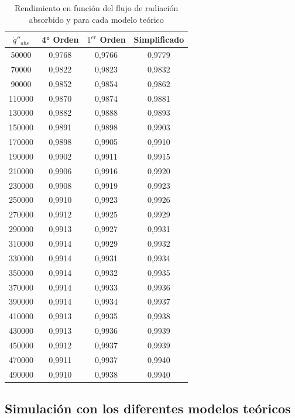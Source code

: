 \begin{table}[H]
\centering
\caption{Rendimiento en función del flujo de radiación absorbido y para cada modelo teórico}
\label{tab:rendimiento_qabs}
\begin{tabular}{cccc}
$\dot q''_{abs}$    & 4° Orden & $1^{er}$ Orden & Simplificado \\ \hline
50000  & 0,9768   & 0,9766    & 0,9779       \\
70000  & 0,9822   & 0,9823    & 0,9832       \\
90000  & 0,9852   & 0,9854    & 0,9862       \\
110000 & 0,9870   & 0,9874    & 0,9881       \\
130000 & 0,9882   & 0,9888    & 0,9893       \\
150000 & 0,9891   & 0,9898    & 0,9903       \\
170000 & 0,9898   & 0,9905    & 0,9910       \\
190000 & 0,9902   & 0,9911    & 0,9915       \\
210000 & 0,9906   & 0,9916    & 0,9920       \\
230000 & 0,9908   & 0,9919    & 0,9923       \\
250000 & 0,9910   & 0,9923    & 0,9926       \\
270000 & 0,9912   & 0,9925    & 0,9929       \\
290000 & 0,9913   & 0,9927    & 0,9931       \\
310000 & 0,9914   & 0,9929    & 0,9932       \\
330000 & 0,9914   & 0,9931    & 0,9934       \\
350000 & 0,9914   & 0,9932    & 0,9935       \\
370000 & 0,9914   & 0,9933    & 0,9936       \\
390000 & 0,9914   & 0,9934    & 0,9937       \\
410000 & 0,9913   & 0,9935    & 0,9938       \\
430000 & 0,9913   & 0,9936    & 0,9939       \\
450000 & 0,9912   & 0,9937    & 0,9939       \\
470000 & 0,9911   & 0,9937    & 0,9940       \\
490000 & 0,9910   & 0,9938    & 0,9940
\end{tabular}
\end{table}


\subsection{Simulación con los diferentes modelos teóricos}

